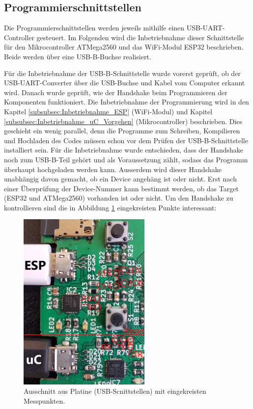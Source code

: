 \newpage
\subsection{Programmierschnittstellen}
\label{sec:Inbetriebnahme_Programmierschnittstellen}

Die Programmierschnittstellen werden jeweils mithilfe einen USB-UART-Controller gesteuert. Im Folgenden wird die Inbetriebnahme dieser Schnittstelle für den Mikrocontroller ATMega2560 und das WiFi-Modul ESP32 beschrieben. Beide werden über eine USB-B-Buchse realisiert.

Für die Inbetriebnahme der USB-B-Schnittstelle wurde vorerst geprüft, ob der USB-UART-Converter über die USB-Buchse und Kabel vom Computer erkannt wird. Danach wurde geprüft, wie der Handshake beim Programmieren der Komponenten funktioniert. Die Inbetriebnahme der Programmierung wird in den Kapitel \ref{subsubsec:Inbetriebnahme_ESP} (WiFi-Modul) und Kapitel \ref{subsubsec:Inbetriebnahme_uC_Vorgehen} (Mikrocontroller) beschrieben. Dies geschieht ein wenig parallel, denn die Programme zum Schreiben, Kompilieren und Hochladen des Codes müssen schon vor dem Prüfen der USB-B-Schnittstelle installiert sein. Für die Inbetriebnahme wurde entschieden, dass der Handshake noch zum USB-B-Teil gehört und als Voraussetzung zählt, sodass das Programm überhaupt hochgeladen werden kann. Ausserdem wird dieser Handshake unabhängig davon gemacht, ob ein Device angehäng ist oder nicht. Erst nach einer Überprüfung der Device-Nummer kann bestimmt werden, ob das Target (ESP32 und ATMega2560) vorhanden ist oder nicht. Um den Handshake zu kontrollieren sind die in Abbildung \ref{fig:USB_B_Print} eingekreisten Punkte interessant:


\begin{figure}[h!]
\center
\includegraphics[width = 0.58\textwidth]{graphics/USB_B_Print}
\caption{Ausschnitt aus Platine (USB-Scnittstellen) mit eingekreisten Messpunkten.}
\label{fig:USB_B_Print}
\end{figure}

